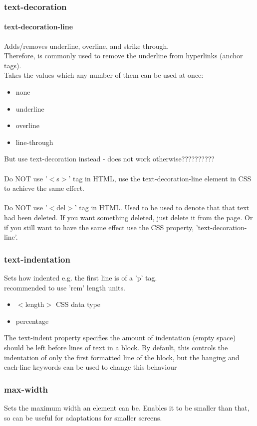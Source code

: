 \documentclass[]{article}
\newcommand{\<}{\guilsinglleft}
\renewcommand{\>}{\guilsinglright}
\begin{document}
\subsubsection{text-decoration}
\paragraph{text-decoration-line}
Adds/removes underline, overline, and strike through.
\\
Therefore, is commonly used to remove the underline from hyperlinks (anchor tags).
\\
Takes the values which any number of them can be used at once:
\begin{itemize}
	\item none
	\item underline
	\item overline
	\item line-through
\end{itemize}
But use text-decoration instead - does not work otherwise??????????
\\\\
Do NOT use '$<$s$>$' tag in HTML, use the text-decoration-line element in CSS to achieve the same effect.
\\\\
Do NOT use '$<$del$>$' tag in HTML.  Used to be used to denote that that text had been deleted.  If you want something deleted, just delete it from the page.  Or if you still want to have the same effect use the CSS property, 'text-decoration-line'.

\subsubsection{text-indentation}
Sets how indented e.g. the first line is of a 'p' tag.
\\
recommended to use 'rem' length units.  
\begin{itemize}
	\item $<$length$>$ CSS data type
	\item percentage
\end{itemize}
The text-indent property specifies the amount of indentation (empty space) should be left before lines of text in a block. By default, this controls the indentation of only the first formatted line of the block, but the hanging and each-line keywords can be used to change this behaviour

\subsubsection{max-width}
Sets the maximum width an element can be.  Enables it to be smaller than that, so can be useful for adaptations for smaller screens.
\end{document}
